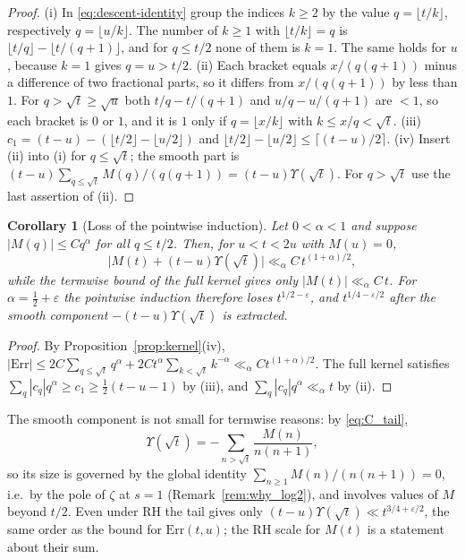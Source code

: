 \documentclass[11pt]{amsart}
\numberwithin{equation}{section}
\theoremstyle{plain}
\newtheorem{corollary}[theorem]{Corollary}
\theoremstyle{definition}
\theoremstyle{remark}
\newcommand{\eps}{\varepsilon}
\begin{document}
\begin{proof}
(i) In \eqref{eq:descent-identity} group the indices $k\ge2$ by the value
$q=\lfloor t/k\rfloor$, respectively $q=\lfloor u/k\rfloor$. The number of
$k\ge1$ with $\lfloor t/k\rfloor=q$ is
$\lfloor t/q\rfloor-\lfloor t/(q+1)\rfloor$, and for $q\le t/2$ none of them
is $k=1$. The same holds for $u$, because $k=1$ gives $q=u>t/2$. (ii) Each
bracket equals $x/(q(q+1))$ minus a difference of two fractional parts, so
it differs from $x/(q(q+1))$ by less than $1$. For $q>\sqrt t\ge\sqrt u$ both
$t/q-t/(q+1)$ and $u/q-u/(q+1)$ are $<1$, so each bracket is $0$ or $1$, and
it is $1$ only if $q=\lfloor x/k\rfloor$ with $k\le x/q<\sqrt t$.
(iii) $c_1=(t-u)-(\lfloor t/2\rfloor-\lfloor u/2\rfloor)$ and
$\lfloor t/2\rfloor-\lfloor u/2\rfloor\le\lceil(t-u)/2\rceil$.
(iv) Insert (ii) into (i) for $q\le\sqrt t$; the smooth part is
$(t-u)\sum_{q\le\sqrt t}M(q)/(q(q+1))=(t-u)\Upsilon(\sqrt t)$. For
$q>\sqrt t$ use the last assertion of (ii).
\end{proof}

\begin{corollary}[Loss of the pointwise induction]
\label{cor:induction-loss}
Let $0<\alpha<1$ and suppose $|M(q)|\le Cq^\alpha$ for all $q\le t/2$. Then,
for $u<t<2u$ with $M(u)=0$,
\begin{equation}
\label{eq:induction-loss}
\bigl|M(t)+(t-u)\Upsilon(\sqrt t)\bigr|\ll_\alpha C\,t^{(1+\alpha)/2},
\end{equation}
while the termwise bound of the full kernel gives only
$|M(t)|\ll_\alpha C\,t$. For $\alpha=\frac12+\eps$ the pointwise induction
therefore loses $t^{1/2-\eps}$, and $t^{1/4-\eps/2}$ after the smooth
component $-(t-u)\Upsilon(\sqrt t)$ is extracted.
\end{corollary}

\begin{proof}
By Proposition~\ref{prop:kernel}(iv),
$|\mathrm{Err}|\le2C\sum_{q\le\sqrt t}q^\alpha+2Ct^\alpha\sum_{k<\sqrt t}k^{-\alpha}
\ll_\alpha Ct^{(1+\alpha)/2}$. The full kernel satisfies
$\sum_q|c_q|q^\alpha\ge c_1\ge\frac12(t-u-1)$ by (iii), and
$\sum_q|c_q|q^\alpha\ll_\alpha t$ by (ii).
\end{proof}

The smooth component is not small for termwise reasons: by
\eqref{eq:C_tail},
\[
\Upsilon(\sqrt t)=-\sum_{n>\sqrt t}\frac{M(n)}{n(n+1)},
\]
so its size is governed by the global identity
$\sum_{n\ge1}M(n)/(n(n+1))=0$, i.e.\ by the pole of $\zeta$ at $s=1$
(Remark~\ref{rem:why_log2}), and involves values of $M$ beyond $t/2$. Even
under RH the tail gives only $(t-u)\Upsilon(\sqrt t)\ll t^{3/4+\eps/2}$, the
same order as the bound for $\mathrm{Err}(t,u)$; the RH scale for $M(t)$ is a statement
about their sum.
\end{document}
